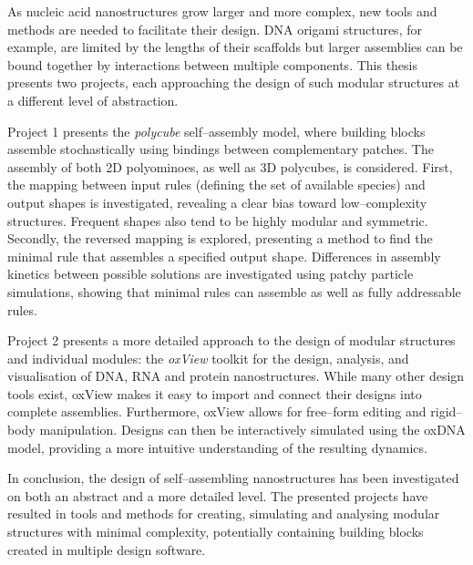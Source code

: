 
As nucleic acid nanostructures grow larger and more complex, new tools and methods are needed to facilitate their design. DNA origami structures, for example, are limited by the lengths of their scaffolds but larger assemblies can be bound together by interactions between multiple components. This thesis presents two projects, each approaching the design of such modular structures at a different level of abstraction.

Project 1 presents the \emph{polycube} self--assembly model, where building blocks assemble stochastically using bindings between complementary patches. The assembly of both 2D polyominoes, as well as 3D polycubes, is considered. First, the mapping between input rules (defining the set of available species) and output shapes is investigated, revealing a clear bias toward low--complexity structures. Frequent shapes also tend to be highly modular and symmetric. Secondly, the reversed mapping is explored, presenting a method to find the minimal rule that assembles a specified output shape. Differences in assembly kinetics between possible solutions are investigated using patchy particle simulations, showing that minimal rules can assemble as well as fully addressable rules.

Project 2 presents a more detailed approach to the design of modular structures and individual modules: the \emph{oxView} toolkit for the design, analysis, and visualisation of DNA, RNA and protein nanostructures. While many other design tools exist, oxView makes it easy to import and connect their designs into complete assemblies. Furthermore, oxView allows for free--form editing and rigid--body manipulation. Designs can then be interactively simulated using the oxDNA model, providing a more intuitive understanding of the resulting dynamics.

In conclusion, the design of self--assembling nanostructures has been investigated on both an abstract and a more detailed level. The presented projects have resulted in tools and methods for creating, simulating and analysing modular structures with minimal complexity, potentially containing building blocks created in multiple design software.